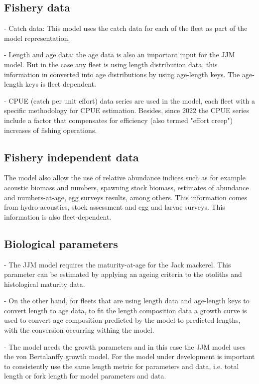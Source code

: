\documentclass{article}
\begin{document}
\subsection{Fishery data}

- Catch data: This model uses the catch data for each of the fleet as part of the model representation.

- Length and age data: the age data is also an important input for the JJM model. But in the case any fleet is using length distribution data, this information in converted into age distributions by using age-length keys. The age-length keys is fleet dependent.

- CPUE (catch per unit effort) data series are used in the model, each fleet with a specific methodology for CPUE estimation. Besides, since 2022 the CPUE series include a factor that compensates for efficiency (also termed "effort creep") increases of fishing operations.

\subsection{Fishery independent data}

The model also allow the use of relative abundance indices such as for example acoustic biomass and numbers, spawning stock biomass, estimates of abundance and numbers-at-age, egg surveys results, among others. This information comes from hydro-acoustics, stock assessment and egg and larvae surveys. This information is also fleet-dependent.

\subsection{Biological parameters}

- The JJM model requires the maturity-at-age for the Jack mackerel. This parameter can be estimated by applying an ageing criteria to the otoliths and histological maturity data.

- On the other hand, for fleets that are using length data and age-length keys to convert length to age data, to fit the length composition data a growth curve is used to convert age composition predicted by the model to predicted lengths, with the conversion occurring withing the model.

- The model needs the growth parameters and in this case the JJM model uses the von Bertalanffy growth model. For the model under development is important to consistently use the same length metric for parameters and data, i.e. total length or fork length for model parameters and data.
\end{document}
